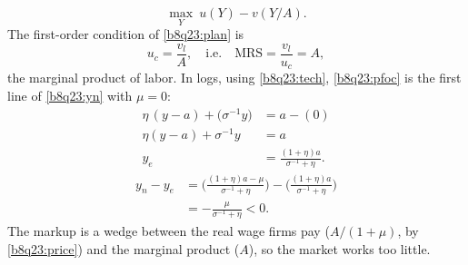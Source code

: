 \begin{sol}
\begin{equation}
\max_Y\ u(Y)-v(Y/A). \label{b8q23:plan}
\end{equation}
The first-order condition of \eqref{b8q23:plan} is
\begin{equation}
u_c=\frac{v_l}{A},\quad\text{i.e.}\quad \mathrm{MRS}=\frac{v_l}{u_c}=A, \label{b8q23:pfoc}
\end{equation}
the marginal product of labor. In logs, using \eqref{b8q23:tech}, \eqref{b8q23:pfoc} is the first line of \eqref{b8q23:yn} with $\mu=0$:
\begin{align}
\eta\,(y-a)+\big(\sigma^{-1}y\big)&=a-(0)\nonumber\\
\eta(y-a)+\sigma^{-1}y&=a\nonumber\\
y_e&=\frac{(1+\eta)a}{\sigma^{-1}+\eta}. \label{b8q23:ye}
\end{align}
\begin{align}
y_n-y_e&=\Big(\frac{(1+\eta)a-\mu}{\sigma^{-1}+\eta}\Big)-\Big(\frac{(1+\eta)a}{\sigma^{-1}+\eta}\Big)\nonumber\\
&=-\frac{\mu}{\sigma^{-1}+\eta}<0. \label{b8q23:gap}
\end{align}
The markup is a wedge between the real wage firms pay ($A/(1+\mu)$, by \eqref{b8q23:price}) and the marginal product ($A$), so the
market works too little.
\end{sol}

